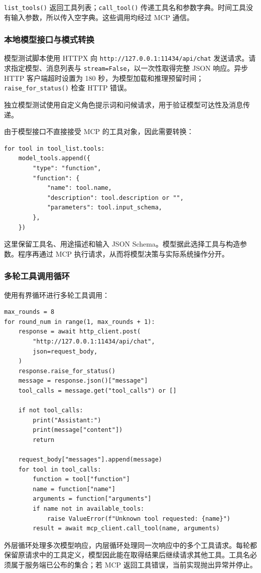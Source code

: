 \documentclass[12pt,a4paper]{ctexart}
\begin{document}
\texttt{list\_tools()} 返回工具列表；\texttt{call\_tool()} 传递工具名和参数字典。时间工具没有输入参数，所以传入空字典。这些调用均经过 MCP 通信。

\subsubsection{本地模型接口与模式转换}
模型测试脚本使用 HTTPX 向 \texttt{http://127.0.0.1:11434/api/chat} 发送请求。请求指定模型、消息列表与 \texttt{stream=False}，以一次性取得完整 JSON 响应。异步 HTTP 客户端超时设置为 180 秒，为模型加载和推理预留时间；\texttt{raise\_for\_status()} 检查 HTTP 错误。

独立模型测试使用自定义角色提示词和问候请求，用于验证模型可达性及消息传递。

由于模型接口不直接接受 MCP 的工具对象，因此需要转换：
\begin{lstlisting}
for tool in tool_list.tools:
    model_tools.append({
        "type": "function",
        "function": {
            "name": tool.name,
            "description": tool.description or "",
            "parameters": tool.input_schema,
        },
    })
\end{lstlisting}
这里保留工具名、用途描述和输入 JSON Schema。模型据此选择工具与构造参数。程序再通过 MCP 执行请求，从而将模型决策与实际系统操作分开。

\subsubsection{多轮工具调用循环}
使用有界循环进行多轮工具调用：
\begin{lstlisting}
max_rounds = 8
for round_num in range(1, max_rounds + 1):
    response = await http_client.post(
        "http://127.0.0.1:11434/api/chat",
        json=request_body,
    )
    response.raise_for_status()
    message = response.json()["message"]
    tool_calls = message.get("tool_calls") or []

    if not tool_calls:
        print("Assistant:")
        print(message["content"])
        return

    request_body["messages"].append(message)
    for tool in tool_calls:
        function = tool["function"]
        name = function["name"]
        arguments = function["arguments"]
        if name not in available_tools:
            raise ValueError(f"Unknown tool requested: {name}")
        result = await mcp_client.call_tool(name, arguments)
\end{lstlisting}
外层循环处理多次模型响应，内层循环处理同一次响应中的多个工具请求。每轮都保留原请求中的工具定义，模型因此能在取得结果后继续请求其他工具。工具名必须属于服务端已公布的集合；若 MCP 返回工具错误，当前实现抛出异常并停止。
\end{document}
